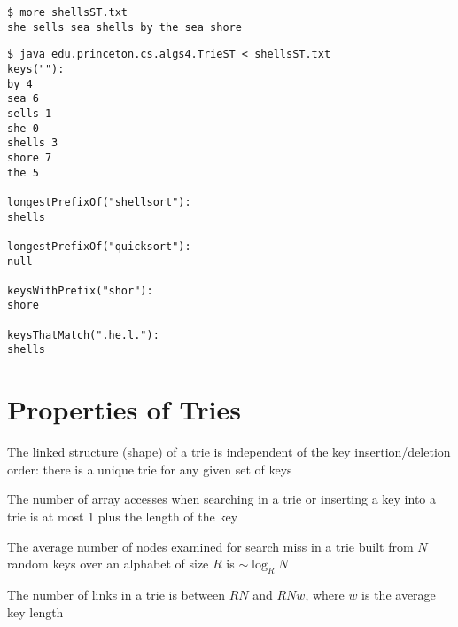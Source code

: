 \documentclass[8pt,a4paper,compress,handout]{beamer}
\begin{document}
\begin{frame}[fragile]
\pause

\begin{lstlisting}[language={}]
$ more shellsST.txt 
she sells sea shells by the sea shore
\end{lstlisting}

\pause

\begin{lstlisting}[language={}]
$ java edu.princeton.cs.algs4.TrieST < shellsST.txt 
keys(""):
by 4
sea 6
sells 1
she 0
shells 3
shore 7
the 5

longestPrefixOf("shellsort"):
shells

longestPrefixOf("quicksort"):
null

keysWithPrefix("shor"):
shore

keysThatMatch(".he.l."):
shells
\end{lstlisting}
\end{frame}

\section{Properties of Tries}
\begin{frame}[fragile]
\pause

The linked structure (shape) of a trie is independent of the key insertion/deletion order: there is a unique trie for any given set of keys

\pause
\bigskip

The number of array accesses when searching in a trie or inserting
a key into a trie is at most 1 plus the length of the key

\pause
\bigskip

The average number of nodes examined for search miss in a trie built from $N$ random keys over an alphabet of size $R$ is $\sim \log_R N$

\pause
\bigskip

The number of links in a trie is between $RN$ and $RNw$, where $w$ is
the average key length
\end{frame}
\end{document}
